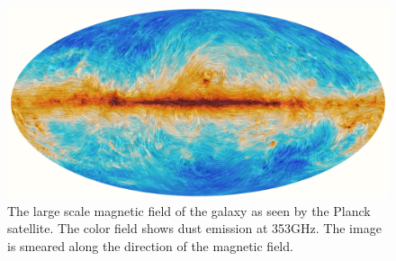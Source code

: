 
\begin{figure} \begin{center}
\includegraphics[width=\textwidth]{figs/2015_353GHz_B-field.png}
\caption[ ]{The large scale magnetic field of the galaxy as seen by the Planck
satellite. The color field shows dust emission at 353GHz.  The image is smeared
along the direction of the magnetic field.  \citep{PlanckXIX15}}
\label{fig.PlanckField} \end{center} \end{figure}
